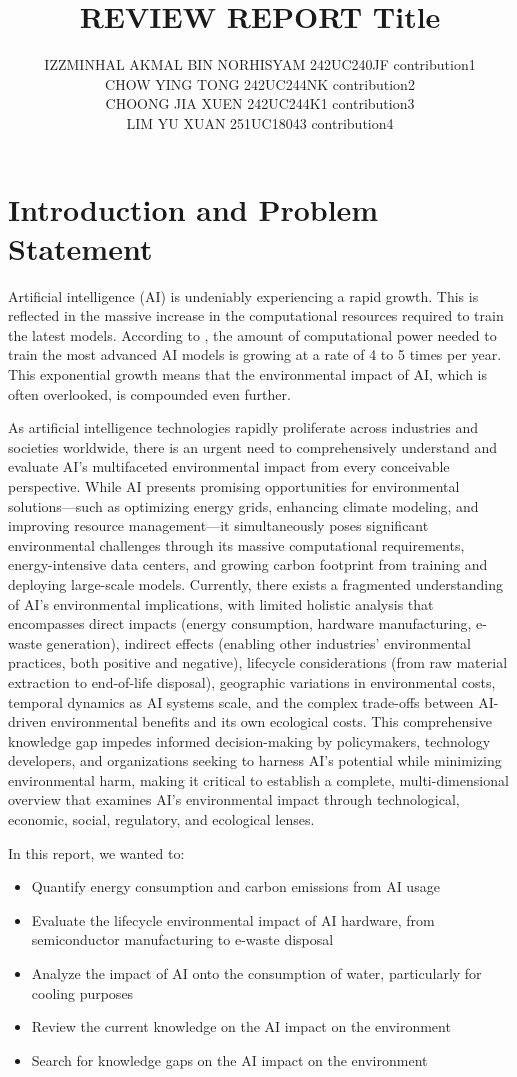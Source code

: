 \documentclass[a4paper, 12pt]{article}
\author{
IZZMINHAL AKMAL BIN NORHISYAM \quad 242UC240JF \quad contribution1 \\
CHOW YING TONG \quad 242UC244NK \quad contribution2\\
CHOONG JIA XUEN \quad 242UC244K1 \quad contribution3\\
LIM YU XUAN \quad 251UC18043 \quad contribution4\\
}
\title{ REVIEW REPORT  Title  }
\begin{document}
\maketitle


\section{Introduction and Problem Statement}
Artificial intelligence (AI) is undeniably experiencing a rapid growth. This is reflected in the massive increase in the computational resources required to train the latest models. According to \citet{Sevilla_Roldan_2024}, the amount of computational power needed to train the most advanced AI models is growing at a rate of 4 to 5 times per year. This exponential growth means that the environmental impact of AI, which is often overlooked, is compounded even further.

As artificial intelligence technologies rapidly proliferate across industries and societies worldwide, there is an urgent need to comprehensively understand and evaluate AI's multifaceted environmental impact from every conceivable perspective. While AI presents promising opportunities for environmental solutions—such as optimizing energy grids, enhancing climate modeling, and improving resource management—it simultaneously poses significant environmental challenges through its massive computational requirements, energy-intensive data centers, and growing carbon footprint from training and deploying large-scale models. Currently, there exists a fragmented understanding of AI's environmental implications, with limited holistic analysis that encompasses direct impacts (energy consumption, hardware manufacturing, e-waste generation), indirect effects (enabling other industries' environmental practices, both positive and negative), lifecycle considerations (from raw material extraction to end-of-life disposal), geographic variations in environmental costs, temporal dynamics as AI systems scale, and the complex trade-offs between AI-driven environmental benefits and its own ecological costs. This comprehensive knowledge gap impedes informed decision-making by policymakers, technology developers, and organizations seeking to harness AI's potential while minimizing environmental harm, making it critical to establish a complete, multi-dimensional overview that examines AI's environmental impact through technological, economic, social, regulatory, and ecological lenses.

In this report, we wanted to:
\begin{itemize}
    \item Quantify energy consumption and carbon emissions from AI usage
    \item Evaluate the lifecycle environmental impact of AI hardware, from semiconductor manufacturing to e-waste disposal
    \item Analyze the impact of AI onto the consumption of water, particularly for cooling purposes
    \item Review the current knowledge on the AI impact on the environment
    \item Search for knowledge gaps on the AI impact on the environment
\end{itemize}
\end{document}
